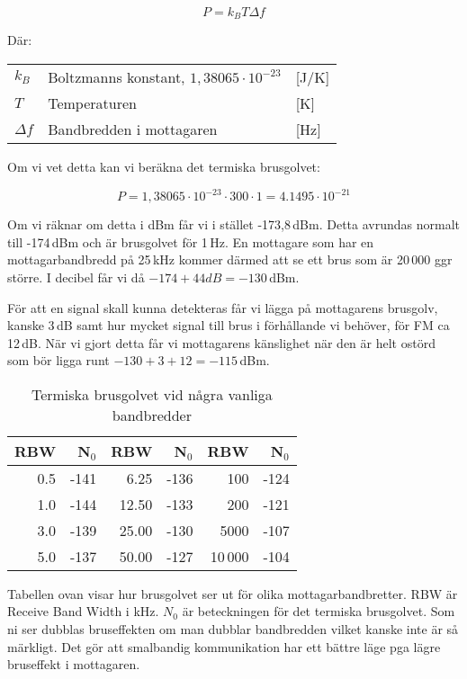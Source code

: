 $$P=k_BT\Delta f$$

Där:

\begin{tabular}{lll}
	$k_B$      & Boltzmanns konstant, $1,38065\cdot 10^{-23}$ & [J/K] \\
	$T$        & Temperaturen                                 & [K]   \\
	$\Delta f$ & Bandbredden i mottagaren                     & [Hz]
\end{tabular}

Om vi vet detta kan vi beräkna det termiska brusgolvet:

$$P = 1,38065\cdot 10^{-23} \cdot 300 \cdot 1 = 4.1495\cdot 10^{-21}$$

Om vi räknar om detta i dBm får vi i stället -173,8\,dBm. Detta avrundas
normalt till -174\,dBm och är brusgolvet för 1\,Hz. En mottagare som har en
mottagarbandbredd på 25\,kHz kommer därmed att se ett brus som är 20\,000 ggr
större. I decibel får vi då $-174 + 44 dB = -130$\,dBm.

För att en signal skall kunna detekteras får vi lägga på mottagarens brusgolv,
kanske 3\,dB samt hur mycket signal till brus i förhållande vi behöver, för FM
ca 12\,dB. När vi gjort detta får vi mottagarens känslighet när den är helt
ostörd som bör ligga runt $-130 + 3 + 12 = -115$\,dBm.

\begin{table}[H]
\centering
\begin{tabular}{rr|rr|rr}
	\textbf{RBW} & \textbf{N$_0$} & \textbf{RBW} & \textbf{N$_0$} & \textbf{RBW} & \textbf{N$_0$} \\ \hline
	         0.5 &           -141 &         6.25 &           -136 &          100 &           -124 \\
	         1.0 &           -144 &        12.50 &           -133 &          200 &           -121 \\
	         3.0 &           -139 &        25.00 &           -130 &         5000 &           -107 \\
	         5.0 &           -137 &        50.00 &           -127 &        10\,000 &           -104
\end{tabular}
\caption{Termiska brusgolvet vid några vanliga bandbredder}
\end{table}

Tabellen ovan visar hur brusgolvet ser ut för olika mottagarbandbretter. RBW är
Receive Band Width i kHz. $N_0$ är beteckningen för det termiska brusgolvet. Som
ni ser dubblas bruseffekten om man dubblar bandbredden vilket kanske inte är så
märkligt. Det gör att smalbandig kommunikation har ett bättre läge pga lägre
bruseffekt i mottagaren.


